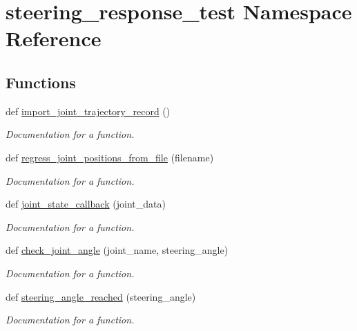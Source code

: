 \hypertarget{namespacesteering__response__test}{}\section{steering\+\_\+response\+\_\+test Namespace Reference}
\label{namespacesteering__response__test}
\subsection*{Functions}
\begin{DoxyCompactItemize}
\item 
def \mbox{\hyperlink{namespacesteering__response__test_a894a6cd85840974184c9da11ccbb7bd4}{import\+\_\+joint\+\_\+trajectory\+\_\+record}} ()
\begin{DoxyCompactList}\small\item\em Documentation for a function. \end{DoxyCompactList}\item 
def \mbox{\hyperlink{namespacesteering__response__test_a04bf2c362541edcbad0d0a2f0c7d2fdc}{regress\+\_\+joint\+\_\+positions\+\_\+from\+\_\+file}} (filename)
\begin{DoxyCompactList}\small\item\em Documentation for a function. \end{DoxyCompactList}\item 
def \mbox{\hyperlink{namespacesteering__response__test_a18b1fed754b9f6fc3c2993cdbb0d14e9}{joint\+\_\+state\+\_\+callback}} (joint\+\_\+data)
\begin{DoxyCompactList}\small\item\em Documentation for a function. \end{DoxyCompactList}\item 
def \mbox{\hyperlink{namespacesteering__response__test_af859bb1c210c019053b42c2e9c7d713d}{check\+\_\+joint\+\_\+angle}} (joint\+\_\+name, steering\+\_\+angle)
\begin{DoxyCompactList}\small\item\em Documentation for a function. \end{DoxyCompactList}\item 
def \mbox{\hyperlink{namespacesteering__response__test_a2f87b67822170ef5c3a9a868293aeedc}{steering\+\_\+angle\+\_\+reached}} (steering\+\_\+angle)
\begin{DoxyCompactList}\small\item\em Documentation for a function. \end{DoxyCompactList}\item 

\end{DoxyCompactItemize}
